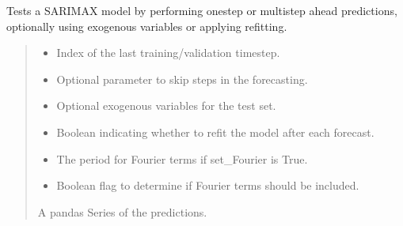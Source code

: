 \documentclass[letterpaper,10pt,english]{sphinxmanual}
\begin{document}
\begin{fulllineitems}
\begin{fulllineitems}
\label{\detokenize{docs/model_testing:model_testing.ModelTest.test_SARIMAX_model}}
\pysigstartsignatures
{}
\pysigstopsignatures
\sphinxAtStartPar
Tests a SARIMAX model by performing one\sphinxhyphen{}step or multi\sphinxhyphen{}step ahead predictions, optionally using exogenous variables or applying refitting.
\begin{quote}\begin{description}
\begin{itemize}
\item {} 
\sphinxAtStartPar
{} \textendash{} Index of the last training/validation timestep.

\item {} 
\sphinxAtStartPar
{} \textendash{} Optional parameter to skip steps in the forecasting.

\item {} 
\sphinxAtStartPar
{} \textendash{} Optional exogenous variables for the test set.

\item {} 
\sphinxAtStartPar
{} \textendash{} Boolean indicating whether to refit the model after each forecast.

\item {} 
\sphinxAtStartPar
{} \textendash{} The period for Fourier terms if set\_Fourier is True.

\item {} 
\sphinxAtStartPar
{} \textendash{} Boolean flag to determine if Fourier terms should be included.

\end{itemize}

\sphinxAtStartPar
A pandas Series of the predictions.

\end{description}\end{quote}

\end{fulllineitems}


\end{fulllineitems}
\end{document}
